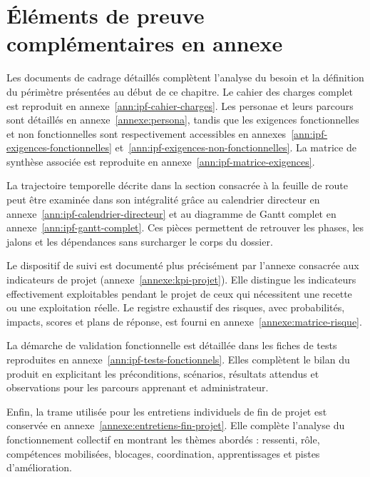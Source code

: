 \section{Éléments de preuve complémentaires en annexe}

Les documents de cadrage détaillés complètent l'analyse du besoin et la définition du périmètre présentées au début de ce chapitre. Le cahier des charges complet est reproduit en annexe~\ref{ann:ipf-cahier-charges}. Les personae et leurs parcours sont détaillés en annexe~\ref{annexe:persona}, tandis que les exigences fonctionnelles et non fonctionnelles sont respectivement accessibles en annexes~\ref{ann:ipf-exigences-fonctionnelles} et~\ref{ann:ipf-exigences-non-fonctionnelles}. La matrice de synthèse associée est reproduite en annexe~\ref{ann:ipf-matrice-exigences}.

La trajectoire temporelle décrite dans la section consacrée à la feuille de route peut être examinée dans son intégralité grâce au calendrier directeur en annexe~\ref{ann:ipf-calendrier-directeur} et au diagramme de Gantt complet en annexe~\ref{ann:ipf-gantt-complet}. Ces pièces permettent de retrouver les phases, les jalons et les dépendances sans surcharger le corps du dossier.

Le dispositif de suivi est documenté plus précisément par l'annexe consacrée aux indicateurs de projet (annexe~\ref{annexe:kpi-projet}). Elle distingue les indicateurs effectivement exploitables pendant le projet de ceux qui nécessitent une recette ou une exploitation réelle. Le registre exhaustif des risques, avec probabilités, impacts, scores et plans de réponse, est fourni en annexe~\ref{annexe:matrice-risque}.

La démarche de validation fonctionnelle est détaillée dans les fiches de tests reproduites en annexe~\ref{ann:ipf-tests-fonctionnels}. Elles complètent le bilan du produit en explicitant les préconditions, scénarios, résultats attendus et observations pour les parcours apprenant et administrateur.

Enfin, la trame utilisée pour les entretiens individuels de fin de projet est conservée en annexe~\ref{annexe:entretiens-fin-projet}. Elle complète l'analyse du fonctionnement collectif en montrant les thèmes abordés : ressenti, rôle, compétences mobilisées, blocages, coordination, apprentissages et pistes d'amélioration.